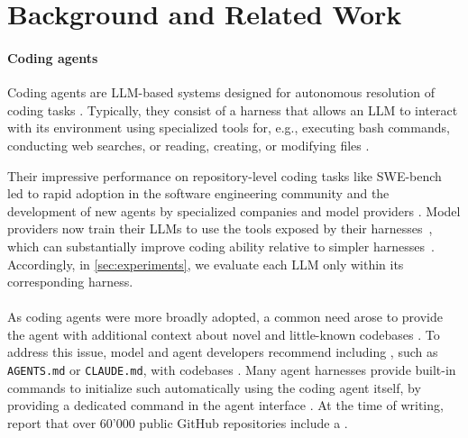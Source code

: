 \section{Background and Related Work}
\label{sec:related-work}
\label{sec:background}

\paragraph{Coding agents} Coding agents are LLM-based systems designed for autonomous resolution of coding tasks \citep{yang2024sweagent}. Typically, they consist of a harness that allows an LLM to interact with its environment using specialized tools for, e.g., executing bash commands, conducting web searches, or reading, creating, or modifying files \citep{wang2025openhands, yang2024sweagent}.

Their impressive performance on repository-level coding tasks like SWE-bench \citep{swebench} led to rapid adoption in the software engineering community \citep{cursor} and the development of new agents by specialized companies \citep{AiderAI,wang2025openhands} and model providers \citep{openaiCodex2026,googleGeminiCli,QwenLMQwen3Coder,ClaudeCodeDocsOverview}. 
Model providers now train their LLMs to use the tools exposed by their harnesses~\citep{QwenLMQwen3Coder}, which can substantially improve coding ability relative to simpler harnesses~\citep{swebench-bash}.
Accordingly, in \cref{sec:experiments}, we evaluate each LLM only within its corresponding harness.

\paragraph{\Agentsmds}
As coding agents were more broadly adopted, a common need arose to provide the agent with additional context about novel and little-known codebases \citep{WhyICreatedAgentsMd,builderioImproveYourAICodeOutputWithAgentsMd}.
To address this issue, model and agent developers recommend including \emph{\agentsmds{}}, such as \texttt{AGENTS.md} or \texttt{CLAUDE.md}, with codebases \citep{OpenAIAgenticAIFoundation2025,UsingClaudeMdFiles}.
Many agent harnesses provide built-in commands to initialize such \agentsmds{} automatically using the coding agent itself, \eg{} by providing a dedicated  command in the agent interface \citep{openaiCodex2026,QwenLMQwen3Coder,ClaudeCodeDocsOverview}.
At the time of writing, \citet{AGENTSMd2025} report that over 60'000 public GitHub repositories include a \agentsmd{}.

